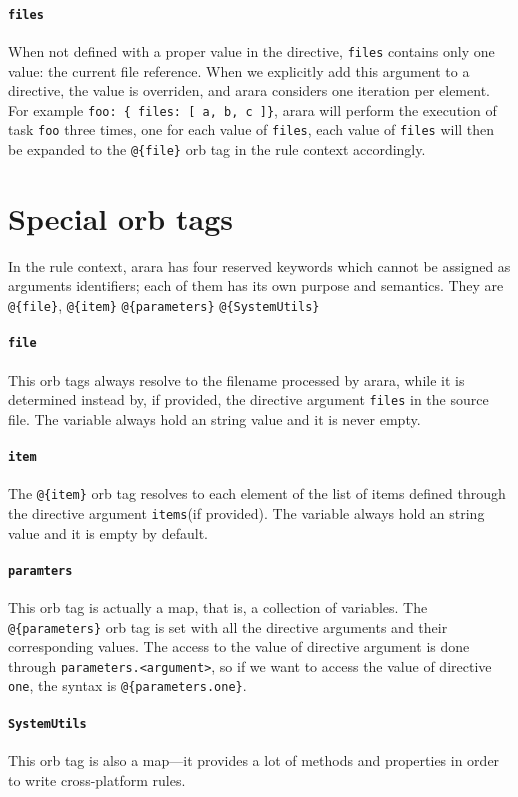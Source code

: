 \documentclass[a4paper]{article}
\begin{document}
\paragraph{\texttt{files}}
When not defined with a proper value in the directive, \verb|files| contains only one value: the current file reference. When we explicitly add this argument to a directive, the value is overriden, and arara considers one iteration per element. 
For example \verb|foo: { files: [ a, b, c ]}|, arara will perform the execution of task \verb|foo| three times, one for each value of \verb|files|, each value of \verb|files| will then be expanded to the \verb|@{file}| orb tag in the rule context accordingly.
\section{Special orb tags}
In the rule context, arara has four reserved keywords which cannot be assigned as arguments identifiers; each of them has its own purpose and semantics. They are \verb|@{file}|, \verb|@{item}| \verb|@{parameters}| \verb|@{SystemUtils}|
\paragraph{\texttt{file}}
This orb tags always resolve to the filename processed by arara, while it is determined instead by, if provided, the directive argument \verb|files| in the source file.
The variable always hold an string value and it is never empty.
\paragraph{\texttt{item}}
The \verb|@{item}| orb tag resolves to each element of the list of items defined through the directive argument \verb|items|(if provided). The variable always hold an string value and it is empty by default.
\paragraph{\texttt{paramters}}
This orb tag is actually a map, that is, a collection of variables. The \verb|@{parameters}| orb tag is set with all the directive arguments and their corresponding values.
The access to the value of directive argument is done through \verb|parameters.<argument>|, so if we want to access the value of directive \verb|one|, the syntax is \verb|@{parameters.one}|.
\paragraph{\texttt{SystemUtils}} 
This orb tag is also a map---it provides a lot of methods and properties in order to write cross-platform rules.
\end{document}
